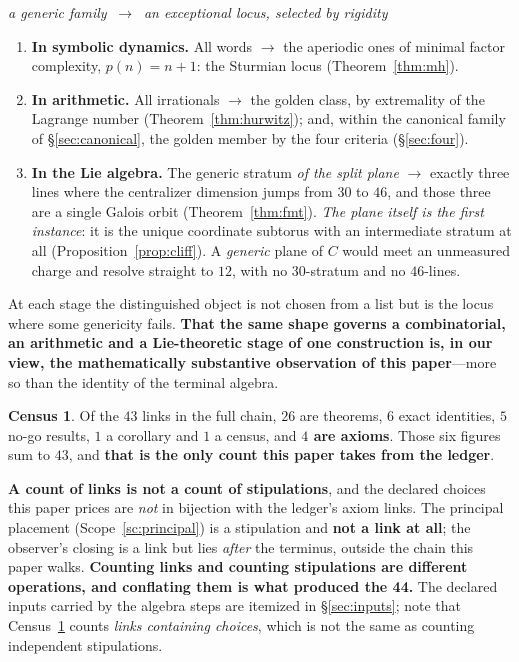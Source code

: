 \documentclass[11pt,reqno]{amsart}
\theoremstyle{plain}
\theoremstyle{definition}
\newtheorem{census}[theorem]{Census}
\theoremstyle{remark}
\begin{document}
\begin{center}
\emph{a generic family} $\ \longrightarrow\ $ \emph{an exceptional locus, selected by
rigidity}
\end{center}

\begin{enumerate}[leftmargin=2.2em]
\item \textbf{In symbolic dynamics.} All words $\longrightarrow$ the aperiodic ones of
  minimal factor complexity, $p(n)=n+1$: the Sturmian locus
  (Theorem~\ref{thm:mh}).
\item \textbf{In arithmetic.} All irrationals $\longrightarrow$ the golden class, by
  extremality of the Lagrange number (Theorem~\ref{thm:hurwitz}); and, within the
  canonical family of \S\ref{sec:canonical}, the golden member by the four
  criteria (\S\ref{sec:four}).
\item \textbf{In the Lie algebra.} The generic stratum \emph{of the split plane}
  $\longrightarrow$ exactly three lines where the centralizer dimension jumps from $30$
  to $46$, and those three are a single Galois orbit (Theorem~\ref{thm:fmt}). \emph{The
  plane itself is the first instance}: it is the unique coordinate subtorus with an
  intermediate stratum at all (Proposition~\ref{prop:cliff}). A \emph{generic} plane of
  $C$ would meet an unmeasured charge and resolve straight to $12$, with no $30$-stratum
  and no $46$-lines.
\end{enumerate}

At each stage the distinguished object is not chosen from a list but is the locus where
some genericity fails. \textbf{That the same shape governs a combinatorial, an
arithmetic and a Lie-theoretic stage of one construction is, in our view, the
mathematically substantive observation of this paper}---more so than the identity of the
terminal algebra.

\begin{census}\label{cen:forced}
Of the $43$ links in the full chain, $26$ are theorems, $6$ exact identities, $5$ no-go
results, $1$ a corollary and $1$ a census, and \textbf{$4$ are axioms}. Those six figures
sum to $43$, and \textbf{that is the only count this paper takes from the ledger}.

\textbf{A count of links is not a count of stipulations}, and the declared choices this paper prices are \emph{not} in bijection with the ledger's
axiom links. The principal placement (Scope~\ref{sc:principal}) is a stipulation and
\textbf{not a link at all}; the observer's closing is a link but lies \emph{after} the
terminus, outside the chain this paper walks. \textbf{Counting links and counting
stipulations are different operations, and conflating them is what produced the
44.}
The declared inputs carried by the algebra steps are itemized in \S\ref{sec:inputs};
note that Census~\ref{cen:forced} counts \emph{links containing choices}, which is not
the same as counting independent stipulations.
\end{census}
\end{document}
